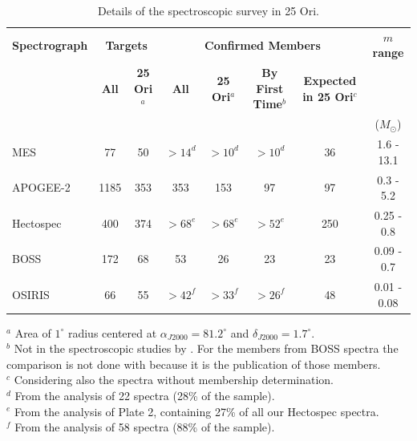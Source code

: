 \documentclass[12pt]{article}
\begin{document}
\begin{table} \scriptsize
\begin{center}
 \caption{Details of the spectroscopic survey in 25 Ori.}
 \label{tab:all_spectra}
 \begin{threeparttable}
  	\setlength{\tabcolsep}{10pt}
	\begin{tabular}{@{\extracolsep{2pt}}lccccccc@{}}
	\toprule
	{\bf Spectrograph} & \multicolumn{2}{c}{{\bf Targets}} & \multicolumn{4}{c}{{\bf Confirmed Members}}            & {\bf $m$ range} \\
	\cline{2-3}
	\cline{4-7}
	                   & {\bf All} & {\bf 25 Ori$^a$}      & {\bf All} & {\bf 25 Ori$^a$} & {\bf By First Time$^b$} & {\bf Expected in 25 Ori$^c$} &                 \\
	                   &           &                       &           &                  &                         &                              & ($M_\odot$)     \\
	\midrule
	MES          & 77   & 50  & $>14^d$ & $>10^d$ & $>10^d$ & 36  & 1.6  - 13.1 \\
	APOGEE-2     & 1185 & 353 & 353     & 153     & 97      & 97  & 0.3  - 5.2  \\ 
	Hectospec    & 400  & 374 & $>68^e$ & $>68^e$ & $>52^e$ & 250 & 0.25 - 0.8  \\
	BOSS         & 172  & 68  & 53      & 26      & 23      & 23  & 0.09 - 0.7  \\
	OSIRIS       & 66   & 55  & $>42^f$ & $>33^f$ & $>26^f$ & 48  & 0.01 - 0.08  \\
	\bottomrule
	\end{tabular}
	\begin{tablenotes}
	  $^a$ Area of $1^\circ$ radius \citep{Briceno2005,Briceno2007} centered at $\alpha_{J2000}=81.2^\circ$ and $\delta_{J2000}=1.7^\circ$. \\
	  $^b$ Not in the spectroscopic studies by \citet{Briceno2005,Briceno2007,Downes2014,Downes2015,Suarez2017,Briceno2018}. For the members from BOSS spectra the comparison is not done with \citet{Suarez2017} because it is the publication of those members. \\
	  $^c$ Considering also the spectra without membership determination. \\
	  $^d$ From the analysis of 22 spectra (28\% of the sample). \\
	  $^e$ From the analysis of Plate 2, containing 27\% of all our Hectospec spectra. \\
	  $^f$ From the analysis of 58 spectra (88\% of the sample). \\
	\end{tablenotes}
 \end{threeparttable}
\end{center}
\end{table}
\end{document}
